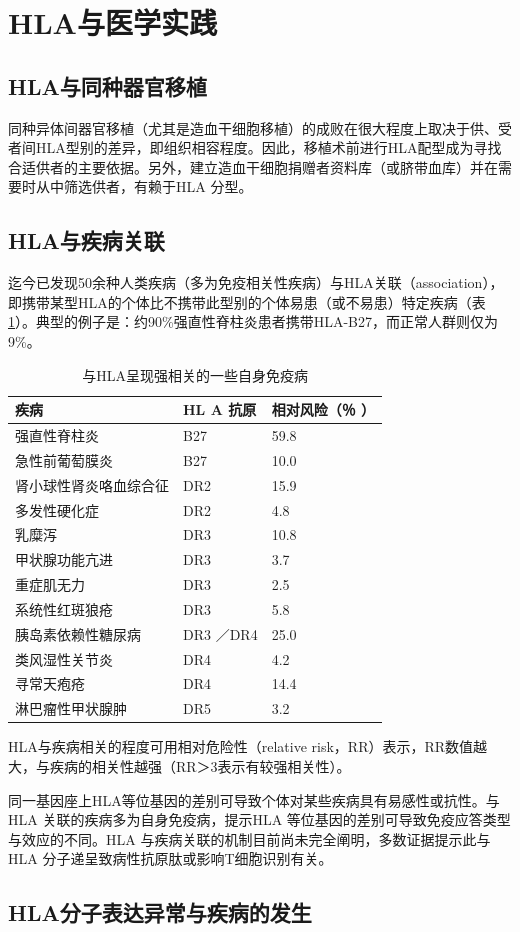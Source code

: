 \section{HLA与医学实践}


\subsection{HLA与同种器官移植}

同种异体间器官移植（尤其是造血干细胞移植）的成败在很大程度上取决于供、受者间HLA型别的差异，即组织相容程度。因此，移植术前进行HLA配型成为寻找合适供者的主要依据。另外，建立造血干细胞捐赠者资料库（或脐带血库）并在需要时从中筛选供者，有赖于HLA
分型。


\subsection{HLA与疾病关联}

迄今已发现50余种人类疾病（多为免疫相关性疾病）与HLA关联（association），即携带某型HLA的个体比不携带此型别的个体易患（或不易患）特定疾病（表\ref{tab7-2}）。典型的例子是：约90\%强直性脊柱炎患者携带HLA-B27，而正常人群则仅为9\%。

\begin{longtable}[]{@{}lll@{}}
    \caption{与HLA呈现强相关的一些自身免疫病}
    \label{tab7-2}\\
\toprule
疾病 & HL A 抗原 & 相对风险（％ ）\tabularnewline
\midrule
\endhead
强直性脊柱炎 & B27 & 59.8\tabularnewline
急性前葡萄膜炎 & B27 & 10.0\tabularnewline
肾小球性肾炎咯血综合征 & DR2 & 15.9\tabularnewline
多发性硬化症 & DR2 & 4.8\tabularnewline
乳糜泻 & DR3 & 10.8\tabularnewline
甲状腺功能亢进 & DR3 & 3.7\tabularnewline
重症肌无力 & DR3 & 2.5\tabularnewline
系统性红斑狼疮 & DR3 & 5.8\tabularnewline
胰岛素依赖性糖尿病 & DR3 ／DR4 & 25.0\tabularnewline
类风湿性关节炎 & DR4 & 4.2\tabularnewline
寻常天疱疮 & DR4 & 14.4\tabularnewline
淋巴瘤性甲状腺肿 & DR5 & 3.2\tabularnewline
\bottomrule
\end{longtable}

HLA与疾病相关的程度可用相对危险性（relative
risk，RR）表示，RR数值越大，与疾病的相关性越强（RR＞3表示有较强相关性）。

同一基因座上HLA等位基因的差别可导致个体对某些疾病具有易感性或抗性。与HLA
关联的疾病多为自身免疫病，提示HLA
等位基因的差别可导致免疫应答类型与效应的不同。HLA
与疾病关联的机制目前尚未完全阐明，多数证据提示此与HLA
分子递呈致病性抗原肽或影响T细胞识别有关。


\subsection{HLA分子表达异常与疾病的发生}

